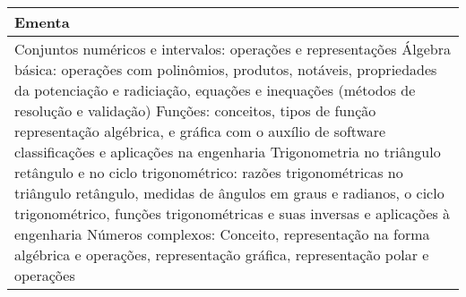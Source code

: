 \begin{quadro}[ht!]
\begin{tabular}{|p{3cm} p{2cm} p{3cm} p{2cm} p{3cm} p{2cm}|}
\multicolumn{6}{|p{15cm}|}{\cellcolor{blue1} Ementa} \\\hline
\hline\multicolumn{6}{|p{15cm}|}{\scriptsize Conjuntos numéricos e intervalos: operações e representações Álgebra básica: operações com polinômios, produtos, notáveis, propriedades da potenciação e radiciação, equações e inequações (métodos de resolução e validação) Funções: conceitos, tipos de função representação algébrica, e gráfica com o auxílio de software classificações e aplicações na engenharia Trigonometria no triângulo retângulo e no ciclo trigonométrico: razões trigonométricas no triângulo retângulo, medidas de ângulos em graus e radianos, o ciclo trigonométrico, funções trigonométricas e suas inversas e aplicações à engenharia Números complexos: Conceito, representação na forma algébrica e operações, representação gráfica, representação polar e operações}\\\hline 
\hline
	\end{tabular}
\end{quadro}


